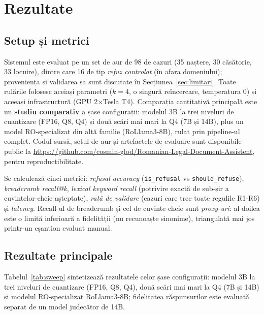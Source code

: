\chapter{Rezultate}
\label{cap:evaluare}

\section{Setup și metrici}

Sistemul este evaluat pe un set de aur de 98 de cazuri (35 naștere, 30 căsătorie, 33 locuire), dintre care 16 de tip \emph{refuz controlat} (în afara domeniului); proveniența și validarea sa sunt discutate în Secțiunea~\ref{sec:limitari}. Toate rulările folosesc aceiași parametri ($k=4$, o singură reîncercare, temperatura 0) și aceeași infrastructură (GPU 2$\times$Tesla T4). Comparația cantitativă principală este un \textbf{studiu comparativ} a șase configurații: modelul 3B la trei niveluri de cuantizare (FP16, Q8, Q4) și două scări mai mari la Q4 (7B și 14B), plus un model RO-specializat din altă familie (RoLlama3-8B), rulat prin pipeline-ul complet. Codul sursă, setul de aur și artefactele de evaluare sunt disponibile public la \url{https://github.com/cosmin-glod/Romanian-Legal-Document-Assistent}, pentru reproductibilitate.

Se calculează cinci metrici: \emph{refusal accuracy} (\texttt{is\_refusal} vs \texttt{should\_refuse}), \emph{breadcrumb recall@k}, \emph{lexical keyword recall} (potrivire exactă de sub-șir a cuvintelor-cheie așteptate), \emph{rată de validare} (cazuri care trec toate regulile R1-R6) și \emph{latency}. Recall-ul de breadcrumb și cel de cuvinte-cheie sunt \emph{proxy-uri}: al doilea este o limită inferioară a fidelității (nu recunoaște sinonime), triangulată mai jos printr-un eșantion evaluat manual.

\section{Rezultate principale}

Tabelul~\ref{tab:sweep} sintetizează rezultatele celor șase configurații: modelul 3B la trei niveluri de cuantizare (FP16, Q8, Q4), două scări mai mari la Q4 (7B și 14B) și modelul RO-specializat RoLlama3-8B; fidelitatea răspunsurilor este evaluată separat de un model judecător de 14B.

